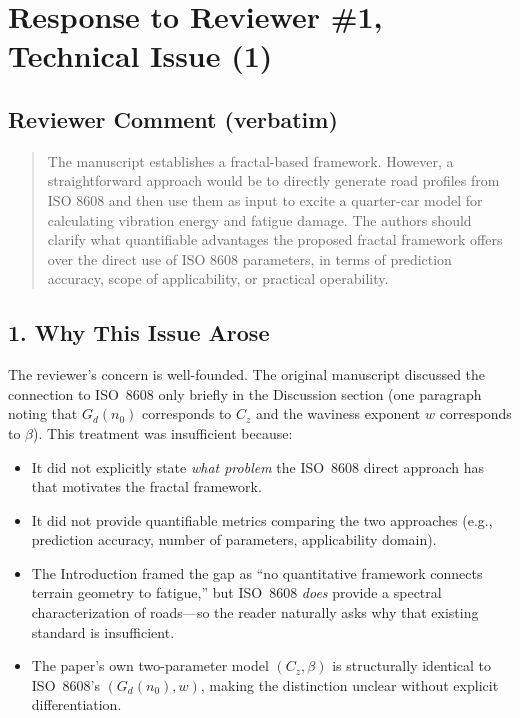 \documentclass[11pt]{article}
\begin{document}
\section*{Response to Reviewer \#1, Technical Issue (1)}

\subsection*{Reviewer Comment (verbatim)}

\begin{quote}
The manuscript establishes a fractal-based framework. However, a straightforward approach would be to directly generate road profiles from ISO 8608 and then use them as input to excite a quarter-car model for calculating vibration energy and fatigue damage. The authors should clarify what quantifiable advantages the proposed fractal framework offers over the direct use of ISO 8608 parameters, in terms of prediction accuracy, scope of applicability, or practical operability.
\end{quote}

\subsection*{1. Why This Issue Arose}

The reviewer's concern is well-founded. The original manuscript discussed the connection to ISO~8608 only briefly in the Discussion section (one paragraph noting that $G_d(n_0)$ corresponds to $C_z$ and the waviness exponent $w$ corresponds to $\beta$). This treatment was insufficient because:

\begin{itemize}
    \item It did not explicitly state \emph{what problem} the ISO~8608 direct approach has that motivates the fractal framework.
    \item It did not provide quantifiable metrics comparing the two approaches (e.g., prediction accuracy, number of parameters, applicability domain).
    \item The Introduction framed the gap as ``no quantitative framework connects terrain geometry to fatigue,'' but ISO~8608 \emph{does} provide a spectral characterization of roads---so the reader naturally asks why that existing standard is insufficient.
    \item The paper's own two-parameter model $(C_z, \beta)$ is structurally identical to ISO~8608's $(G_d(n_0), w)$, making the distinction unclear without explicit differentiation.
\end{itemize}
\end{document}
